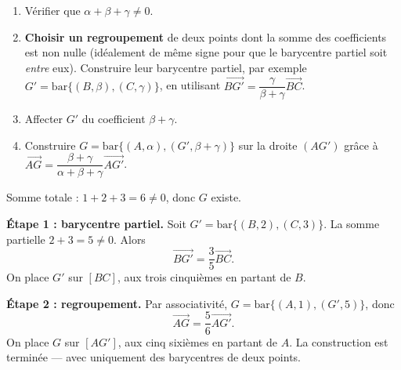 \documentclass[11pt]{article}
\begin{document}
\begin{methode}[Construire $G = \mathrm{bar}\{(A,\alpha),(B,\beta),(C,\gamma)\}$]
\begin{enumerate}
\item Vérifier que $\alpha + \beta + \gamma \neq 0$.
\item \textbf{Choisir un regroupement} de deux points dont la somme des coefficients est non nulle (idéalement de même signe pour que le barycentre partiel soit \emph{entre} eux). Construire leur barycentre partiel, par exemple $G' = \mathrm{bar}\{(B,\beta),(C,\gamma)\}$, en utilisant $\overrightarrow{BG'} = \dfrac{\gamma}{\beta+\gamma}\overrightarrow{BC}$.
\item Affecter $G'$ du coefficient $\beta + \gamma$.
\item Construire $G = \mathrm{bar}\{(A,\alpha),(G',\beta+\gamma)\}$ sur la droite $(AG')$ grâce à $\overrightarrow{AG} = \dfrac{\beta+\gamma}{\alpha+\beta+\gamma}\overrightarrow{AG'}$.
\end{enumerate}
\end{methode}

\begin{exemplebox}[Construction de $G = \mathrm{bar}\{(A,1),(B,2),(C,3)\}$]
Somme totale : $1+2+3 = 6 \neq 0$, donc $G$ existe.

\textbf{Étape 1 : barycentre partiel.} Soit $G' = \mathrm{bar}\{(B,2),(C,3)\}$. La somme partielle $2+3=5 \neq 0$. Alors
\[
\overrightarrow{BG'} = \frac{3}{5}\overrightarrow{BC}.
\]
On place $G'$ sur $[BC]$, aux trois cinquièmes en partant de $B$.

\textbf{Étape 2 : regroupement.} Par associativité, $G = \mathrm{bar}\{(A,1),(G',5)\}$, donc
\[
\overrightarrow{AG} = \frac{5}{6}\overrightarrow{AG'}.
\]
On place $G$ sur $[AG']$, aux cinq sixièmes en partant de $A$. La construction est terminée — avec uniquement des barycentres de deux points.
\end{exemplebox}
\end{document}
